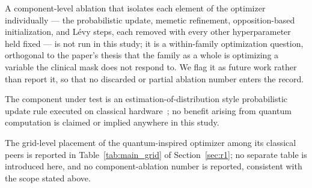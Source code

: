 A component-level ablation that isolates each element of the optimizer
individually --- the probabilistic update, memetic refinement, opposition-based
initialization, and Lévy steps, each removed with every other hyperparameter held
fixed --- is not run in this study; it is a within-family optimization question,
orthogonal to the paper's thesis that the family as a whole is optimizing a
variable the clinical mask does not respond to. We flag it as future work rather
than report it, so that no discarded or partial ablation number enters the record.

The component under test is an estimation-of-distribution style probabilistic
update rule executed on classical hardware~\cite{platel_tevc}; no benefit
arising from quantum computation is claimed or implied anywhere in this study.

The grid-level placement of the quantum-inspired optimizer among its classical
peers is reported in Table~\ref{tab:main_grid} of Section~\ref{sec:r1}; no
separate table is introduced here, and no component-ablation number is reported,
consistent with the scope stated above.
